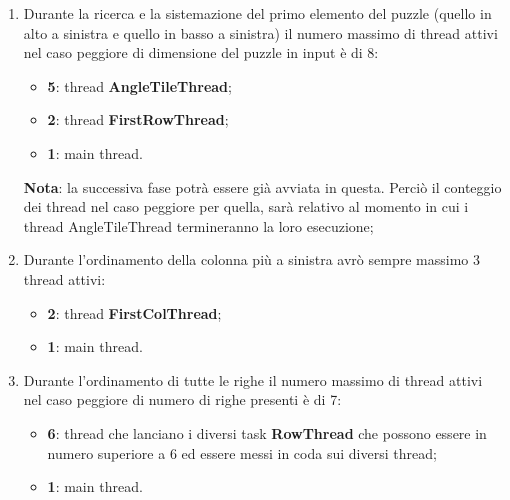 		\begin{enumerate}
			\item Durante la ricerca e la sistemazione del primo elemento del puzzle (quello in alto a sinistra e quello in basso a sinistra) il numero massimo di thread attivi nel caso peggiore di dimensione del puzzle in input è di 8:
				\begin{itemize}
					\item \textbf{5}: thread \textbf{AngleTileThread};
					\item \textbf{2}: thread \textbf{FirstRowThread};
					\item \textbf{1}: main thread.
				\end{itemize}
				\noindent
				\textbf{Nota}: la successiva fase potrà essere già avviata in questa. Perciò il conteggio dei thread nel caso peggiore per quella, sarà relativo al momento in cui i thread AngleTileThread termineranno la loro esecuzione;
				
			\item Durante l'ordinamento della colonna più a sinistra avrò sempre massimo 3 thread attivi:
				\begin{itemize}
					\item \textbf{2}: thread \textbf{FirstColThread};
					\item \textbf{1}: main thread.
				\end{itemize}
				
			\item Durante l'ordinamento di tutte le righe il numero massimo di thread attivi nel caso peggiore di numero di righe presenti è di 7:
				\begin{itemize}
					\item \textbf{6}: thread che lanciano i diversi task \textbf{RowThread} che possono essere in numero superiore a 6 ed essere messi in coda sui diversi thread;
					\item \textbf{1}: main thread.
				\end{itemize}
		\end{enumerate}
	
